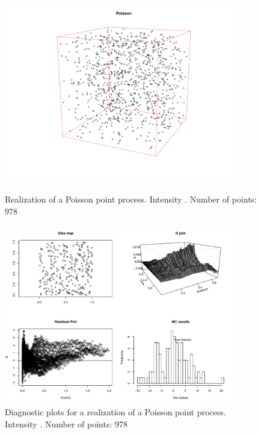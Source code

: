 \documentclass{article}
\begin{document}
\begin{figure}[p]
  \centering
    \includegraphics[width=0.9\textwidth]{PP_Poisson_1000_978.pdf}
  \caption{Realization of a Poisson point process. Intensity . Number of points: 978}
  \label{fig:poissonPP}


	\vspace*{\floatsep}

    \includegraphics[width=0.9\textwidth]{diag_Poisson_1000_978.pdf}
  \caption{Diagnostic plots for a realization of a Poisson point process. Intensity . Number of points: 978}
  \label{fig:poissonDiag}
\end{figure}
\end{document}
